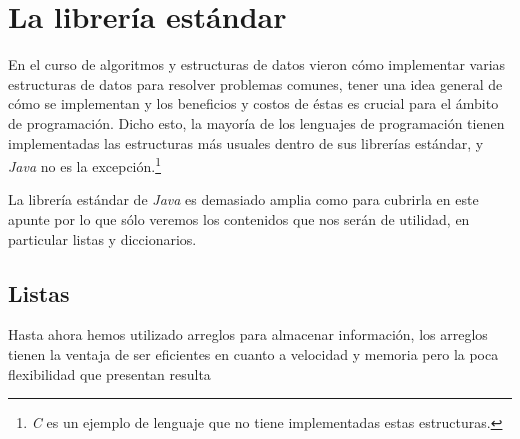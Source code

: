 \section{La librería estándar}
  En el curso de algoritmos y estructuras de datos vieron cómo implementar varias estructuras de 
  datos para resolver problemas comunes, tener una idea general de cómo se implementan y los 
  beneficios y costos de éstas es crucial para el ámbito de programación.
  Dicho esto, la mayoría de los lenguajes de programación tienen implementadas las estructuras más
  usuales dentro de sus librerías estándar, y \textit{Java} no es la excepción.\footnote{\textit{C} 
  es un ejemplo de lenguaje que no tiene implementadas estas estructuras.}

  La librería estándar de \textit{Java} es demasiado amplia como para cubrirla en este apunte por lo
  que sólo veremos los contenidos que nos serán de utilidad, en particular listas y diccionarios.

  \subsection{Listas}
    Hasta ahora hemos utilizado arreglos para almacenar información, los arreglos tienen la ventaja
    de ser eficientes en cuanto a velocidad y memoria pero la poca flexibilidad que presentan resulta
